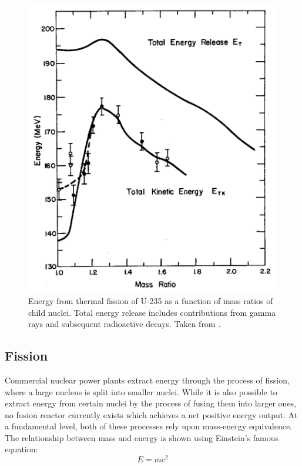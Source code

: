 \begin{figure}[ht]
\centering
\includegraphics[height=13cm]{images/fission_energy_total.png}
\caption[Energy from thermal fission of U-235 as a function of mass ratios of child nuclei. Total energy release includes contributions from gamma rays and subsequent radioactive decays.]{Energy from thermal fission of U-235 as a function of mass ratios of child nuclei. Total energy release includes contributions from gamma rays and subsequent radioactive decays. Taken from \cite{aras1965ranges}.}
\label{figure:fissionenergy}
\end{figure}

\subsection{Fission} %

Commercial nuclear power plants extract energy through the process of fission, where a large nucleus is split into smaller nuclei. While it is also possible to extract energy from certain nuclei by the process of fusing them into larger ones, no fusion reactor currently exists which achieves a net positive energy output. At a fundamental level, both of these processes rely upon mass-energy equivalence. The relationship between mass and energy is shown using Einstein's famous equation:
\begin{equation}
\label{emc2}
    E = mc^{2}
\end{equation}

